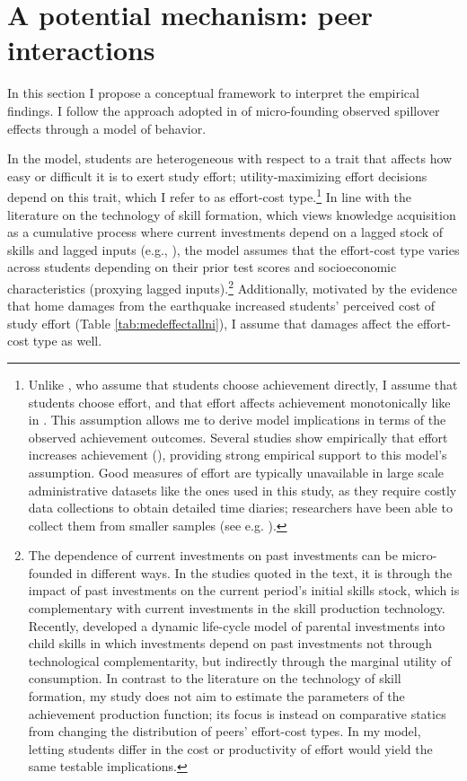 \section{A potential mechanism: peer interactions}\label{sec:new_theory_peer_effects}


In this section I propose a conceptual framework to interpret the empirical findings. I follow the approach adopted in \cite*{blume2015linear} of micro-founding observed spillover effects through a model of behavior.\par 

In the model, students are heterogeneous with respect to a trait that affects how easy or difficult it is to exert study effort; utility-maximizing effort decisions depend on this trait, which I refer to as effort-cost type.\footnote{Unlike \cite*{blume2015linear}, who assume that students choose achievement directly, I assume that students choose effort, and that effort affects achievement monotonically like in \cite{fruehwirth2013identifying}. This assumption allows me to derive model implications in terms of the observed achievement outcomes. Several studies show empirically that effort increases achievement (\cite{stinebrickner2004time,stinebrickner2008causal,de2010must}), providing strong empirical support to this model's assumption. Good measures of effort are typically unavailable in large scale administrative datasets like the ones used in this study, as they require costly data collections to obtain detailed time diaries; researchers have been able to collect them from smaller samples (see e.g. \cite*{conley2024social}).\label{fn:chooseachievement}} In line with the literature on the technology of skill formation, which views knowledge acquisition as a cumulative process where current investments depend on a lagged stock of skills and lagged inputs (e.g., \cite{todd2003specification,cunha2008formulating,cunha2010estimating}), the model assumes that the effort-cost type varies across students depending on their prior test scores and socioeconomic characteristics (proxying lagged inputs).\footnote{The dependence of current investments on past investments can be micro-founded in different ways. In the studies quoted in the text, it is through the impact of past investments on the current period's initial skills stock, which is complementary with current investments in the skill production technology. Recently, \cite*{caucutt2025child} developed a dynamic life-cycle model of parental investments into child skills in which investments depend on past investments not through technological complementarity, but indirectly through the marginal utility of consumption. In contrast to the literature on the technology of skill formation, my study does not aim to estimate the parameters of the achievement production function; its focus is instead on comparative statics from changing the distribution of peers' effort-cost types. In my model, letting students differ in the cost or productivity of effort would yield the same testable implications.  } Additionally, motivated by the evidence that home damages from the earthquake increased students' perceived cost of study effort (Table \ref{tab:medeffectallni}), I assume that damages affect the effort-cost type as well.\par 


